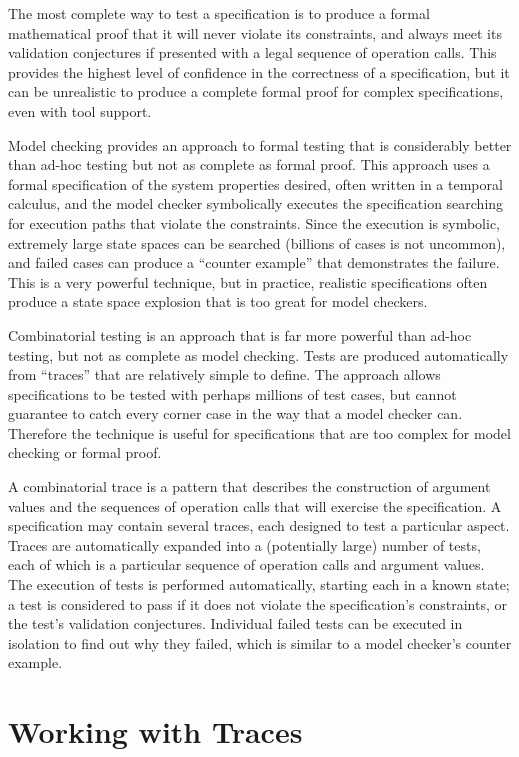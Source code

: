 \documentclass{overturerepchap}
\begin{document}
The most complete way to test a specification is to produce a formal
mathematical proof that it will never violate its constraints, and always meet
its validation conjectures if presented with a legal sequence of operation
calls. This provides the highest level of confidence in the correctness of a
specification, but it can be unrealistic to produce a complete formal proof for
complex specifications, even with tool support.

Model checking provides an approach to formal testing that is considerably
better than ad-hoc testing but not as complete as formal proof. This approach
uses a formal specification of the system properties desired, often written in a
temporal calculus, and the model checker symbolically executes the
specification searching for execution paths that violate the constraints. Since
the execution is symbolic, extremely large state spaces can be searched
(billions of cases is not uncommon), and failed cases can produce a ``counter
example'' that demonstrates the failure. This is a very powerful technique, but
in practice, realistic specifications often produce a state space explosion
that is too great for model checkers.

Combinatorial testing is an approach that is far more powerful than ad-hoc
testing, but not as complete as model checking. Tests are produced automatically
from ``traces'' that are relatively simple to define. The approach allows
specifications to be tested with perhaps millions of test cases, but cannot
guarantee to catch every corner case in the way that a model checker can.
Therefore the technique is useful for specifications that are too complex for
model checking or formal proof.

A combinatorial trace is a pattern that describes the construction of
argument values and the sequences of operation calls that will exercise the
specification. A specification may contain several traces, each designed to test
a particular aspect. Traces are automatically expanded into a (potentially
large) number of tests, each of which is a particular sequence of operation
calls and argument values. The execution of tests is performed
automatically, starting each in a known state; a test is considered to pass if
it does not violate the specification's constraints, or the test's validation
conjectures. Individual failed tests can be executed in isolation to find out
why they failed, which is similar to a model checker's counter example. 

\chapter{Working with Traces}
\label{chap:traces}
\end{document}
